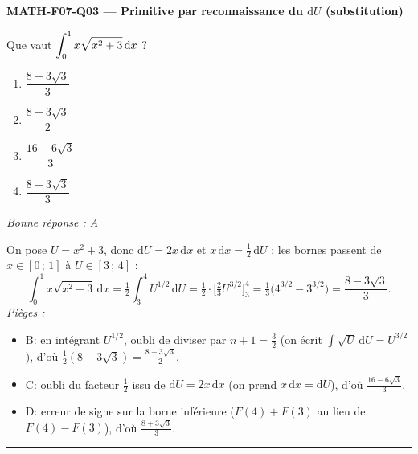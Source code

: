 \documentclass[11pt,a4paper]{article}
\begin{document}
\noindent\textbf{MATH-F07-Q03 --- Primitive par reconnaissance du $\mathrm{d}U$ (substitution)}\par
Que vaut $\displaystyle\int_{0}^{1} x\sqrt{x^{2}+3}\,\mathrm{d}x$ ?
\begin{enumerate}[label=\Alph*)]
\item $\dfrac{8-3\sqrt{3}}{3}$
\item $\dfrac{8-3\sqrt{3}}{2}$
\item $\dfrac{16-6\sqrt{3}}{3}$
\item $\dfrac{8+3\sqrt{3}}{3}$
\end{enumerate}
\textit{Bonne réponse : A}\par
On pose $U=x^{2}+3$, donc $\mathrm{d}U=2x\,\mathrm{d}x$ et $x\,\mathrm{d}x=\tfrac12\,\mathrm{d}U$ ; les bornes passent de $x\in[0\,;\,1]$ à $U\in[3\,;\,4]$ :
\[
\int_{0}^{1} x\sqrt{x^{2}+3}\,\mathrm{d}x=\tfrac12\int_{3}^{4} U^{1/2}\,\mathrm{d}U
=\tfrac12\cdot\Big[\tfrac{2}{3}U^{3/2}\Big]_{3}^{4}=\tfrac13\big(4^{3/2}-3^{3/2}\big)=\dfrac{8-3\sqrt{3}}{3}.
\]
\textit{Pièges :}
\begin{itemize}
\item B: en intégrant $U^{1/2}$, oubli de diviser par $n+1=\tfrac32$ (on écrit $\int\sqrt{U}\,\mathrm{d}U=U^{3/2}$), d'où $\tfrac12(8-3\sqrt{3})=\tfrac{8-3\sqrt{3}}{2}$.
\item C: oubli du facteur $\tfrac12$ issu de $\mathrm{d}U=2x\,\mathrm{d}x$ (on prend $x\,\mathrm{d}x=\mathrm{d}U$), d'où $\tfrac{16-6\sqrt{3}}{3}$.
\item D: erreur de signe sur la borne inférieure ($F(4)+F(3)$ au lieu de $F(4)-F(3)$), d'où $\tfrac{8+3\sqrt{3}}{3}$.
\end{itemize}
\vspace{8pt}\hrule\vspace{8pt}
\end{document}
